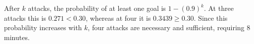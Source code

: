 After $k$ attacks, the probability of at least one goal is $1-(0.9)^k$. At three attacks this is $0.271<0.30$, whereas at four it is $0.3439\ge 0.30$. Since this probability increases with $k$, four attacks are necessary and sufficient, requiring $\boxed 8$ minutes.
